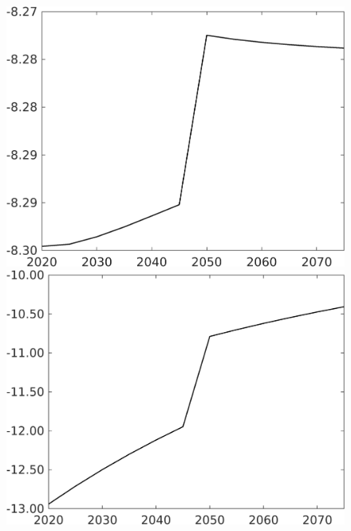 \documentclass[12pt]{article}
\begin{document}
\begin{figure}[h!!]
\begin{minipage}[]{0.32\textwidth}
\end{minipage}
\begin{minipage}[]{0.32\textwidth}
\includegraphics[width=1\textwidth]{../../codding_model/own_basedOnFried/optimalPol_010922_revision/figures/all_13Sept22/CompTaufPER_bytaul_Reg0_Ln_spillover0_nsk0_xgr0_knspil0_sep1_LFlimit1_emsbase0_countec0_GovRev0_etaa0.79_lgd0.png}
\end{minipage}			
\begin{minipage}[]{0.32\textwidth}
\includegraphics[width=1\textwidth]{../../codding_model/own_basedOnFried/optimalPol_010922_revision/figures/all_13Sept22/CompTaufPER_bytaul_Reg0_GFF_spillover0_nsk0_xgr0_knspil0_sep1_LFlimit1_emsbase0_countec0_GovRev0_etaa0.79_lgd0.png}

\end{minipage}
\end{figure}
\end{document}
